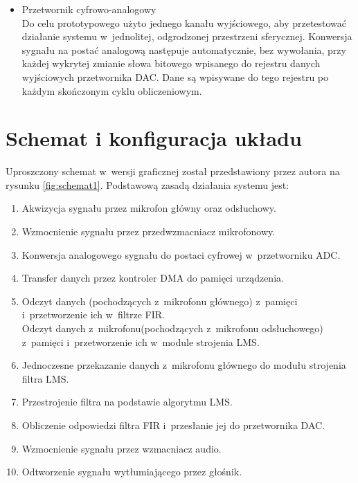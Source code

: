 \begin{enumerate}
\begin{itemize}
		\item Przetwornik cyfrowo-analogowy\\
		Do celu prototypowego użyto jednego kanału wyjściowego, aby przetestować działanie systemu w~jednolitej, odgrodzonej przestrzeni sferycznej. Konwersja sygnału na postać analogową następuje automatycznie, bez wywołania, przy każdej wykrytej zmianie słowa bitowego wpisanego do rejestru danych wyjściowych przetwornika DAC. Dane są wpisywane do tego rejestru po każdym skończonym cyklu obliczeniowym.
	\end{itemize}
\end{enumerate}

\section{Schemat i konfiguracja układu}
\label{sec:config}
Uproszczony schemat w~wersji graficznej został przedstawiony przez autora na rysunku \ref{fig:schemat1}. Podstawową zasadą działania systemu jest:
\begin{enumerate}
	\item Akwizycja sygnału przez mikrofon główny oraz odsłuchowy.
	\item Wzmocnienie sygnału przez przedwzmacniacz mikrofonowy.
	\item Konwersja analogowego sygnału do postaci cyfrowej w~przetworniku ADC.
	\item Transfer danych przez kontroler DMA do pamięci urządzenia.
	\item Odczyt danych (pochodzących z~mikrofonu głównego) z~pamięci i~przetworzenie ich w~filtrze FIR.\\
	Odczyt danych z~mikrofonu(pochodzących z~mikrofonu odsłuchowego) z~pamięci i~przetworzenie ich w~module strojenia LMS.
	\item Jednoczesne przekazanie danych z~mikrofonu głównego do modułu strojenia filtra LMS.
	\item Przestrojenie filtra na podstawie algorytmu LMS.
	\item Obliczenie odpowiedzi filtra FIR i~przesłanie jej do przetwornika DAC.
	\item Wzmocnienie sygnału przez wzmacniacz audio.
	\item Odtworzenie sygnału wytłumiającego przez głośnik.
\end{enumerate}
